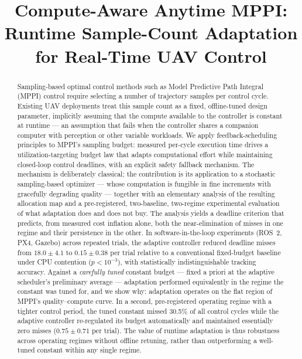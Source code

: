 \documentclass[conference]{IEEEtran}
\title{Compute-Aware Anytime MPPI: Runtime Sample-Count Adaptation\\
for Real-Time UAV Control}
\author{\IEEEauthorblockN{Ishan Jakkulwar}
\IEEEauthorblockA{\todo{affiliation / email / advisor co-authors}}}
\begin{document}
\maketitle

\begin{abstract}
Sampling-based optimal control methods such as Model Predictive Path
Integral (MPPI) control require selecting a number of trajectory samples
per control cycle. Existing UAV deployments treat this sample count as a
fixed, offline-tuned design parameter, implicitly assuming that the compute
available to the controller is constant at runtime --- an assumption that
fails when the controller shares a companion computer with perception or
other variable workloads. We apply feedback-scheduling principles to
MPPI's sampling budget: measured per-cycle execution time drives a
utilization-targeting budget law that adapts computational effort while
maintaining closed-loop control deadlines, with an explicit safety
fallback mechanism. The mechanism is deliberately classical; the
contribution is its application to a stochastic sampling-based optimizer
--- whose computation is fungible in fine increments with gracefully
degrading quality --- together with an elementary analysis of the
resulting allocation map and a pre-registered, two-baseline,
two-regime experimental evaluation of what adaptation does and does not
buy. The analysis yields a deadline criterion that predicts, from
measured cost inflation alone, both the near-elimination of misses in
one regime and their persistence in the other.
In software-in-the-loop experiments (ROS~2, PX4, Gazebo) across repeated
trials, the adaptive controller reduced deadline misses from
$18.0 \pm 4.1$ to $0.15 \pm 0.38$ per trial relative to a conventional
fixed-budget baseline under CPU contention ($p < 10^{-3}$), with
statistically indistinguishable tracking accuracy. Against a
\emph{carefully tuned} constant budget --- fixed a priori at the adaptive
scheduler's preliminary average --- adaptation performed equivalently in
the regime the constant was tuned for, and we show why: adaptation
operates on the flat region of MPPI's quality--compute curve. In a second,
pre-registered operating regime with a tighter control period, the tuned
constant missed 30.5\% of all control cycles while the adaptive controller
re-regulated its budget automatically and maintained essentially zero
misses ($0.75 \pm 0.71$ per trial). The value of runtime adaptation is
thus robustness across operating regimes without offline retuning, rather
than outperforming a well-tuned constant within any single regime.
\end{abstract}
\end{document}
